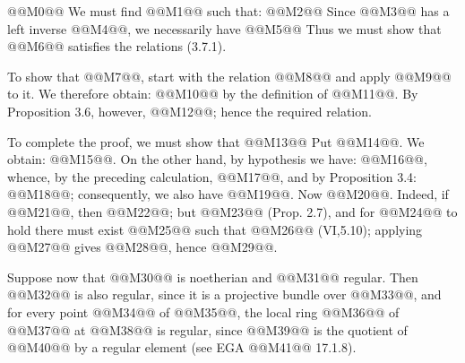 @@M0@@
We must find @@M1@@ such that:
@@M2@@
Since @@M3@@ has a left inverse @@M4@@, we necessarily have
@@M5@@
Thus we must show that @@M6@@ satisfies the relations (3.7.1).

To show that @@M7@@, start with the relation @@M8@@ and apply @@M9@@ to it. We therefore obtain: @@M10@@ by the definition of @@M11@@. By Proposition 3.6, however, @@M12@@; hence the required relation.

To complete the proof, we must show that
@@M13@@
Put @@M14@@. We obtain: @@M15@@. On the other hand, by hypothesis we have: @@M16@@, whence, by the preceding calculation, @@M17@@, and by Proposition 3.4: @@M18@@; consequently, we also have @@M19@@. Now @@M20@@. Indeed, if @@M21@@, then @@M22@@; but @@M23@@ (Prop. 2.7), and for @@M24@@ to hold there must exist @@M25@@ such that @@M26@@ (VI,5.10); applying @@M27@@ gives @@M28@@, hence @@M29@@.

Suppose now that @@M30@@ is noetherian and @@M31@@ regular. Then @@M32@@ is also regular, since it is a projective bundle over @@M33@@, and for every point @@M34@@ of @@M35@@, the local ring @@M36@@ of @@M37@@ at @@M38@@ is regular, since @@M39@@ is the quotient of @@M40@@ by a regular element (see EGA @@M41@@ 17.1.8).
